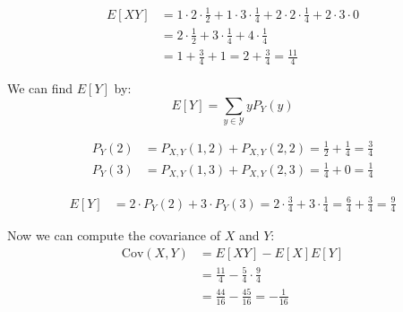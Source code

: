 \begin{align*}
	E[XY] & = 1\cdot 2 \cdot \frac{1}{2} + 1\cdot 3\cdot \frac{1}{4} + 2\cdot 2\cdot \frac{1}{4} + 2\cdot 3 \cdot 0 \\
	      & = 2 \cdot \frac{1}{2} + 3 \cdot \frac{1}{4} + 4 \cdot \frac{1}{4}                                       \\
	      & = 1 + \frac{3}{4} + 1 = 2 + \frac{3}{4} = \frac{11}{4}
\end{align*}

We can find $E[Y]$ by:
\[
	E[Y] = \sum_{y\in\mathcal{Y}}yP_Y(y)
\]

\begin{align*}
	P_Y(2) & = P_{X,Y}(1,2) + P_{X,Y}(2,2) = \frac{1}{2} + \frac{1}{4} = \frac{3}{4} \\
	P_Y(3) & = P_{X,Y}(1,3) + P_{X,Y}(2,3) = \frac{1}{4} + 0 = \frac{1}{4}
\end{align*}

\begin{align*}
	E[Y] & = 2\cdot P_Y(2) + 3\cdot P_Y(3) = 2\cdot\frac{3}{4} + 3\cdot\frac{1}{4} = \frac{6}{4} + \frac{3}{4} = \frac{9}{4}
\end{align*}

Now we can compute the covariance of $X$ and $Y$:
\begin{align*}
	\text{Cov}(X,Y) & = E[XY] - E[X]E[Y]                               \\
	                & = \frac{11}{4} - \frac{5}{4}\cdot\frac{9}{4}     \\
	                & =  \frac{44}{16} - \frac{45}{16} = -\frac{1}{16}
\end{align*}
